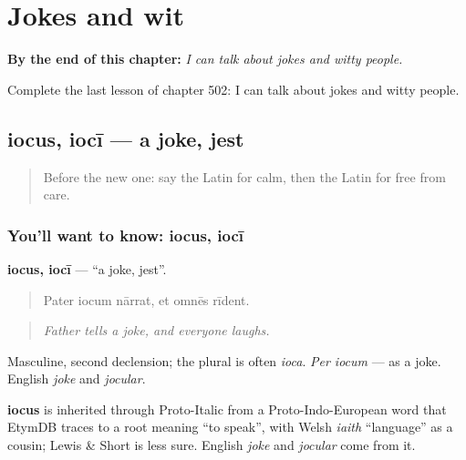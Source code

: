 
\chapter{Jokes and wit}
\label{ch:la-jokes-and-wit}

\begin{chapteropening}
\textbf{By the end of this chapter:} \emph{I can talk about jokes and witty people.}

Complete the last lesson of chapter 502: I can talk about jokes and witty people.
\end{chapteropening}

\section[iocus, iocī]{iocus, iocī — a joke, jest}

\label{lesson:LA-C502-iocus}



\begin{quote}
Before the new one: say the Latin for calm, then the Latin for free from care.
\end{quote}

\subsection*{You'll want to know: iocus, iocī}
\textbf{iocus, iocī} — \textquotedblleft{}a joke, jest\textquotedblright{}.

\begin{quote}
Pater iocum nārrat, et omnēs rīdent.
\end{quote}

\begin{quote}
\emph{Father tells a joke, and everyone laughs.}
\end{quote}

Masculine, second declension; the plural is often \emph{ioca}. \emph{Per iocum} — as a joke. English \emph{joke} and \emph{jocular}.

\begin{cousinweb}
\textbf{iocus} is inherited through Proto-Italic from a Proto-Indo-European word that EtymDB traces to a root meaning \textquotedblleft{}to speak\textquotedblright{}, with Welsh \emph{iaith} \textquotedblleft{}language\textquotedblright{} as a cousin; Lewis \& Short is less sure. English \emph{joke} and \emph{jocular} come from it.
\end{cousinweb}

